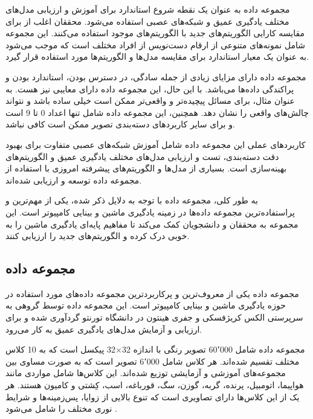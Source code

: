 مجموعه داده
به عنوان یک نقطه شروع استاندارد برای آموزش و ارزیابی مدل‌های مختلف یادگیری عمیق و شبکه‌های عصبی استفاده می‌شود. محققان اغلب از
برای مقایسه کارایی الگوریتم‌های جدید با الگوریتم‌های موجود استفاده می‌کنند. این مجموعه شامل نمونه‌های متنوعی از ارقام دست‌نویس از افراد مختلف است که موجب می‌شود به عنوان یک معیار استاندارد برای مقایسه مدل‌ها و الگوریتم‌ها مورد استفاده قرار گیرد.

مجموعه داده
دارای مزایای زیادی از جمله سادگی، در دسترس بودن، استاندارد بودن و پراکندگی داده‌ها می‌باشد. با این حال، این مجموعه داده دارای معایبی نیز هست. به عنوان مثال، برای مسائل پیچیده‌تر و واقعی‌تر ممکن است
خیلی ساده باشد و نتواند چالش‌های واقعی را نشان دهد. همچنین، این مجموعه داده شامل تنها اعداد 0 تا 9 است و برای سایر کاربردهای دسته‌بندی تصویر ممکن است کافی نباشد.

کاربردهای عملی این مجموعه داده شامل آموزش شبکه‌های عصبی متفاوت برای بهبود دقت دسته‌بندی، تست و ارزیابی مدل‌های مختلف یادگیری عمیق و الگوریتم‌های بهینه‌سازی است. بسیاری از مدل‌ها و الگوریتم‌های پیشرفته امروزی با استفاده از مجموعه داده
توسعه و ارزیابی شده‌اند.

به طور کلی، مجموعه داده
با توجه به دلایل ذکر شده، یکی از مهم‌ترین و پراستفاده‌ترین مجموعه داده‌ها در زمینه یادگیری ماشین و بینایی کامپیوتر است. این مجموعه به محققان و دانشجویان کمک می‌کند تا مفاهیم پایه‌ای یادگیری ماشین را به خوبی درک کرده و الگوریتم‌های جدید را ارزیابی کنند.


\subsection{
	مجموعه داده
}
مجموعه داده
یکی از معروف‌ترین و پرکاربردترین مجموعه داده‌های مورد استفاده در حوزه یادگیری ماشین و بینایی کامپیوتر است. این مجموعه داده توسط گروهی به سرپرستی الکس کریژفسکی%
و جفری هینتون%
در دانشگاه تورنتو گردآوری شده و برای ارزیابی و آزمایش مدل‌های یادگیری عمیق به کار می‌رود.


مجموعه داده
شامل 60٬000 تصویر رنگی با اندازه
32$\times$32
پیکسل است که به 10 کلاس مختلف تقسیم شده‌اند. هر کلاس شامل 6٬000 تصویر است که به صورت مساوی بین مجموعه‌های آموزشی و آزمایشی توزیع شده‌اند. این کلاس‌ها شامل مواردی مانند هواپیما، اتومبیل، پرنده، گربه، گوزن، سگ، قورباغه، اسب، کِشتی و کامیون هستند. هر یک از این کلاس‌ها دارای تصاویری است که تنوع بالایی از زوایا، پس‌زمینه‌ها و شرایط نوری مختلف را شامل می‌شود
\cite{krizhevsky2009learning}.

